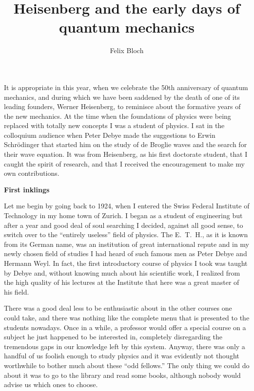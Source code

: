 \documentclass[12pt]{article}
\title{Heisenberg and the early days of quantum mechanics}
\author{Felix Bloch}
\date{}
\begin{document}
\maketitle

\noindent
It is appropriate in this year, when we celebrate the 50th anniversary of quantum mechanics, and during which we have been saddened by the death of one of its leading founders, Werner Heisenberg, to reminisce about the formative years of the new mechanics. At the time when the foundations of physics were being replaced with totally new concepts I was a student of physics. I sat in the colloquium audience when Peter Debye made the suggestions to Erwin Schr\"odinger that started him on the study of de Broglie waves and the search for their wave equation. It was from Heisenberg, as his first doctorate student, that I caught the spirit of research, and that I received the encouragement to make my own contributions.

\bigskip
\noindent
{\bf First inklings}

\smallskip
Let me begin by going back to 1924, when I entered the Swiss Federal Institute of Technology in my home town of Zurich. I began as a student of engineering but after a year and good deal of soul searching I decided, against all good sense, to switch over to the ``entirely useless'' field of physics. The E.~T.~H., as it is known from its German name, was an institution of great international repute and in my newly chosen field of studies I
had heard of such famous men as Peter Debye and Hermann Weyl. In fact, the first introductory course of physics I took was taught by Debye and, without knowing much about his scientific work, I realized from the high quality of his lectures at the Institute that here was a great master of his field.

There was a good deal less to be enthusiastic about in the other courses one
could take, and there was nothing like the complete menu that is presented to the students nowadays. Once in a while, a professor would offer a special course on a subject he just happened to be interested in, completely disregarding the tremendous gaps in our knowledge left by this system. Anyway, there was only a handful of us foolish enough to study physics and it was evidently not thought worthwhile to bother much about these ``odd fellows.'' The only thing we could do about it was to go to the library and read some books, although nobody would advise us which ones to choose.
\end{document}
